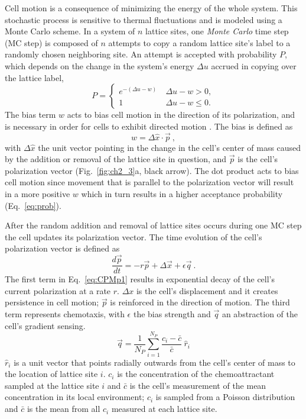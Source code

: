 Cell motion is a consequence of minimizing the energy of the whole system. This stochastic process is sensitive to thermal fluctuations and is modeled using a Monte Carlo scheme. In a system of $n$ lattice sites, one \textit{Monte Carlo} time step (MC step) is composed of $n$ attempts to copy a random lattice site's label to a randomly chosen neighboring site. An attempt is accepted with probability $P$, which depends on the change in the system's energy $\Delta u$ accrued in copying over the lattice label,
\begin{equation} \label{eq:prob}
    P =
    \begin{cases}
        e^{-\left( \Delta u - w \right)} &\ \Delta u - w > 0 , \\
        1 &\ \Delta u - w \leq 0 .
    \end{cases}
\end{equation}
The bias term $w$ acts to bias cell motion in the direction of its polarization, and is necessary in order for cells to exhibit directed motion \cite{szabo2010collective}.
The bias is defined as
\begin{equation}
    w = \Delta\hat{x} \cdot \vec{p} \ ,
\end{equation}
with $\Delta\hat{x}$ the unit vector pointing in the change in the cell's center of mass caused by the addition or removal of the lattice site in question, and $\vec{p}$ is the cell's polarization vector (Fig.\ \ref{fig:ch2_3}a, black arrow). The dot product acts to bias cell motion since movement that is parallel to the polarization vector will result in a more positive $w$ which in turn results in a higher acceptance probability (Eq.\ \ref{eq:prob}).

After the random addition and removal of lattice sites occurs during one MC step the cell updates its polarization vector. The time evolution of the cell's polarization vector is defined as
\begin{equation} \label{eq:CPMp1}
    \frac{d\vec{p}}{dt} = -r\vec{p} + \Delta\vec{x} + \epsilon \vec{q}\ .
\end{equation}
The first term in Eq.\ \ref{eq:CPMp1} results in exponential decay of the cell's current polarization at a rate $r$. $\Delta x$ is the cell's displacement and it creates persistence in cell motion; $\vec{p}$ is reinforced in the direction of motion. The third term represents chemotaxis, with $\epsilon$ the bias strength and $\vec{q}$ an abstraction of the cell's gradient sensing.
\begin{equation} \label{eq:CPMq1}
    \vec{q} = \frac{1}{N_P} \sum_{i=1}^{N_P} \frac{c_i-\bar{c}}{\bar{c}} \ \hat{r}_i
\end{equation}
$\hat{r}_i$ is a unit vector that points radially outwards from the cell's center of mass to the location of lattice site $i$. $c_i$ is the concentration of the chemoattractant sampled at the lattice site $i$ and $\bar{c}$ is the cell's measurement of the mean concentration in its local environment; $c_i$ is sampled from a Poisson distribution and $\bar{c}$ is the mean from all $c_i$ measured at each lattice site.



